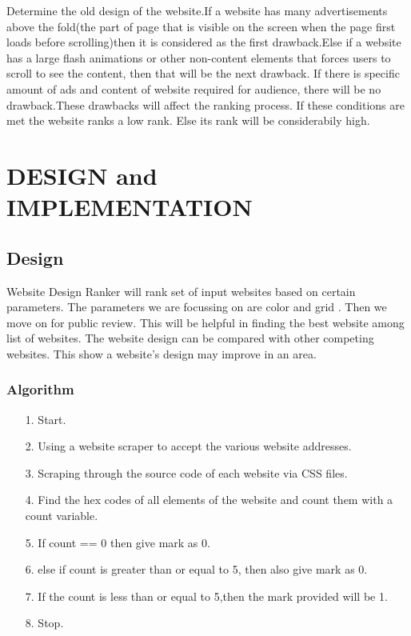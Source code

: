 \documentclass{fisatproject}
\begin{document}
Determine the old design of the website.If a website has many advertisements above the fold(the part of page that is visible on the screen when the page first loads before scrolling)then it is considered as the first drawback.Else if a website has a large flash animations or other
non-content elements that forces users to scroll to see the content, then that will be the next drawback. If there is specific amount of ads and content of website required for audience, there will be no drawback.These drawbacks will affect the ranking process. If these conditions are met the website ranks a low rank. Else its rank will be considerabily high.




\chapter{DESIGN and IMPLEMENTATION}

\section{Design}
Website Design Ranker will rank set of input websites based
on certain parameters.
The parameters we are focussing on are color and grid .
Then we move on for public review.
This will be helpful in finding the best website among list of
websites.
The website design can be compared with other competing
websites.
This show a  website’s design may improve in an area.


\subsection{Algorithm}
\begin{itemize}
	\item[1.] Start.
	\item[2.] Using a website scraper to accept the various website
	addresses.
	\item[3.] Scraping through the source code of each website via CSS files.
	\item[4.] Find the hex codes of all elements of the website and count them with a count variable.
	\item[5.] If count == 0 then give mark as 0.
	\item[6.] else if count is greater than or equal to 5, then also give mark as 0.
	\item[7.]If the count is less than or equal to 5,then the mark provided will be 1.
	\item[8.]Stop.
\end{itemize}
\end{document}
